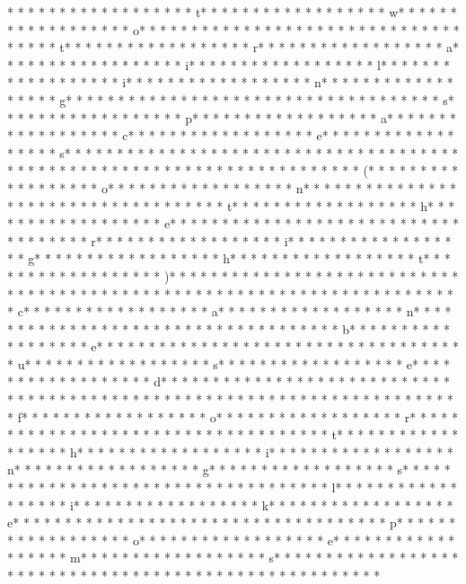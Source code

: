 * * *  * * *  * * *  *  * * *  *  * * *  * t* * *  * * *  * * *  *  * * *  *  * * *  * w* * *  * * *  * * *  *  * * *  *  * * *  * o* * *  * * *  * * *  *  * * *  *  * * *  *  * * *  * * *  * * *  *  * * *  *  * * *  * t* * *  * * *  * * *  *  * * *  *  * * *  * r* * *  * * *  * * *  *  * * *  *  * * *  * a* * *  * * *  * * *  *  * * *  *  * * *  * i* * *  * * *  * * *  *  * * *  *  * * *  * l* * *  * * *  * * *  *  * * *  *  * * *  * i* * *  * * *  * * *  *  * * *  *  * * *  * n* * *  * * *  * * *  *  * * *  *  * * *  * g* * *  * * *  * * *  *  * * *  *  * * *  *  * * *  * * *  * * *  *  * * *  *  * * *  * s* * *  * * *  * * *  *  * * *  *  * * *  * p* * *  * * *  * * *  *  * * *  *  * * *  * a* * *  * * *  * * *  *  * * *  *  * * *  * c* * *  * * *  * * *  *  * * *  *  * * *  * e* * *  * * *  * * *  *  * * *  *  * * *  * s* * *  * * *  * * *  *  * * *  *  * * *  *  * * *  * * *  * * *  *  * * *  *  * * *  *  * * *  * * *  * * *  *  * * *  *  * * *  * 
* * *  * * *  * * *  *  * * *  *  * * *  * (* * *  * * *  * * *  *  * * *  *  * * *  * o* * *  * * *  * * *  *  * * *  *  * * *  * n* * *  * * *  * * *  *  * * *  *  * * *  *  * * *  * * *  * * *  *  * * *  *  * * *  * t* * *  * * *  * * *  *  * * *  *  * * *  * h* * *  * * *  * * *  *  * * *  *  * * *  * e* * *  * * *  * * *  *  * * *  *  * * *  *  * * *  * * *  * * *  *  * * *  *  * * *  * r* * *  * * *  * * *  *  * * *  *  * * *  * i* * *  * * *  * * *  *  * * *  *  * * *  * g* * *  * * *  * * *  *  * * *  *  * * *  * h* * *  * * *  * * *  *  * * *  *  * * *  * t* * *  * * *  * * *  *  * * *  *  * * *  * )* * *  * * *  * * *  *  * * *  *  * * *  *  * * *  * * *  * * *  *  * * *  *  * * *  *  * * *  * * *  * * *  *  * * *  *  * * *  * 
* * *  * * *  * * *  *  * * *  *  * * *  * c* * *  * * *  * * *  *  * * *  *  * * *  * a* * *  * * *  * * *  *  * * *  *  * * *  * n* * *  * * *  * * *  *  * * *  *  * * *  *  * * *  * * *  * * *  *  * * *  *  * * *  * b* * *  * * *  * * *  *  * * *  *  * * *  * e* * *  * * *  * * *  *  * * *  *  * * *  *  * * *  * * *  * * *  *  * * *  *  * * *  * u* * *  * * *  * * *  *  * * *  *  * * *  * s* * *  * * *  * * *  *  * * *  *  * * *  * e* * *  * * *  * * *  *  * * *  *  * * *  * d* * *  * * *  * * *  *  * * *  *  * * *  *  * * *  * * *  * * *  *  * * *  *  * * *  *  * * *  * * *  * * *  *  * * *  *  * * *  * 
* * *  * * *  * * *  *  * * *  *  * * *  * f* * *  * * *  * * *  *  * * *  *  * * *  * o* * *  * * *  * * *  *  * * *  *  * * *  * r* * *  * * *  * * *  *  * * *  *  * * *  *  * * *  * * *  * * *  *  * * *  *  * * *  * t* * *  * * *  * * *  *  * * *  *  * * *  * h* * *  * * *  * * *  *  * * *  *  * * *  * i* * *  * * *  * * *  *  * * *  *  * * *  * n* * *  * * *  * * *  *  * * *  *  * * *  * g* * *  * * *  * * *  *  * * *  *  * * *  * s* * *  * * *  * * *  *  * * *  *  * * *  *  * * *  * * *  * * *  *  * * *  *  * * *  * l* * *  * * *  * * *  *  * * *  *  * * *  * i* * *  * * *  * * *  *  * * *  *  * * *  * k* * *  * * *  * * *  *  * * *  *  * * *  * e* * *  * * *  * * *  *  * * *  *  * * *  *  * * *  * * *  * * *  *  * * *  *  * * *  * p* * *  * * *  * * *  *  * * *  *  * * *  * o* * *  * * *  * * *  *  * * *  *  * * *  * e* * *  * * *  * * *  *  * * *  *  * * *  * m* * *  * * *  * * *  *  * * *  *  * * *  * s* * *  * * *  * * *  *  * * *  *  * * *  *  * * *  * * *  * * *  *  * * *  *  * * *  *  * * *  * * *  * * *  *  * * *  *  * * *  * 
